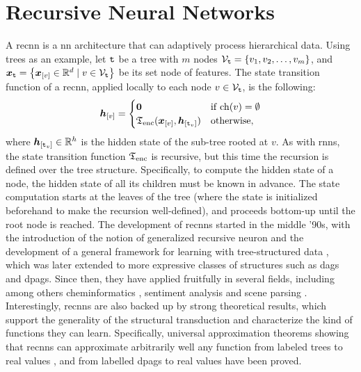 \section{Recursive Neural Networks}
A \gls{recnn} \citep{sperduti1997generalizedneuron,frasconi1998general} is a \gls{nn} architecture that can adaptively process hierarchical data. Using trees as an example, let $\mathtt{t}$ be a tree with $m$ nodes $\Nodes_{\Tree} = \Set{v_1, v_2, \ldots, v_m}$, and $\Vector{x}_{\Tree} = \Set{\Elem{x}{v} \in \Real^d \mid v \in \Nodes_{\Tree}}$ be its set node of features. The state transition function of a \gls{recnn}, applied locally to each node $v \in \Nodes_{\Tree}$, is the following:
\begin{align*}
    \Elem{h}{v}=
    \begin{cases}
        \boldsymbol{0} & \mathrm{if}\; \Fun{ch}(v) = \emptyset\\
        \EncTrans(\Elem{x}{v}, \Elem{h}{\Tree_v}) & \mathrm{otherwise},
    \end{cases}
\end{align*}
where $\Elem{h}{\Tree_v} \in \Real^h$ is the hidden state of the sub-tree rooted at $v$. As with \glspl{rnn}, the state transition function $\mathfrak{T}_{\mathrm{enc}}$ is recursive, but this time the recursion is defined over the tree structure. Specifically, to compute the hidden state of a node, the hidden state of all its children must be known in advance. The state computation starts at the leaves of the tree (where the state is initialized beforehand to make the recursion well-defined), and proceeds bottom-up until the root node is reached.
The development of \glspl{recnn} started in the middle '90s, with the introduction of the notion of generalized recursive neuron \citep{sperduti1997generalizedneuron} and the development of a general framework for learning with tree-structured data \citep{frasconi1998general}, which was later extended to more expressive classes of structures such as \glspl{dag} and \glspl{dpag}. Since then, they have applied fruitfully in several fields, including among others cheminformatics \citep{micheli2007introductionrecnncheminformatics}, sentiment analysis \citep{socher2013recnnsentiment} and scene parsing \citep{socher2011parsingscenes}. Interestingly, \glspl{recnn} are also backed up by strong theoretical results, which support the generality of the structural transduction and characterize the kind of functions they can learn. Specifically, universal approximation theorems showing that \glspl{recnn} can approximate arbitrarily well any function from labeled trees to real values \citep{hammer1999recnn}, and from labelled \glspl{dpag} to real values \citep{hammer2005universal} have been proved.

